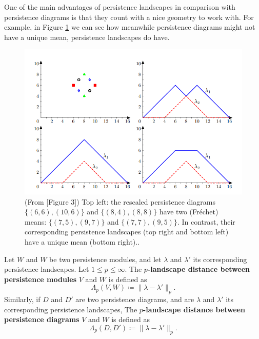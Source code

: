 \begin{example}
    One of the main advantages of persistence landscapes in comparison with persistence diagrams is that they count with a nice geometry to work with. For example, in Figure \ref{fig:landscape-means} we can see how meanwhile persistence diagrams might not have a unique mean, persistence landscapes do have.
    \begin{figure}[H]
        \centering
        \includegraphics[width=\linewidth]{figures/landscape-means.png}
        \caption[Means from persistence landscapes]{(From \cite{bubenik}[Figure 3]) Top left: the rescaled persistence diagrams $\{(6, 6), (10, 6)\}$ and $\{(8, 4), (8, 8)\}$ have two (Fréchet) means: $\{(7, 5), (9, 7)\}$ and $\{(7, 7), (9, 5)\}$. In contrast, their corresponding persistence landscapes (top right and bottom left) have a unique mean (bottom right)..}
        \label{fig:landscape-means}
    \end{figure}
\end{example}

\begin{definition}
    Let $ W $ and $ W $ be two persistence modules, and let $ \lambda $ and $ \lambda' $ its corresponding persistence landscapes. Let $ 1 \leq p \leq \infty $. The {\bf $p$-landscape distance between persistence modules} $ V $ and $ W $ is defined as
    \begin{equation}
        \Lambda_p(V, W) \coloneq \|\lambda - \lambda' \|_p.
    \end{equation}
    Similarly, if $ D $ and $ D' $ are two persistence diagrams, and are $ \lambda $ and $ \lambda' $ its corresponding persistence landscapes, The {\bf $p$-landscape distance between persistence diagrams} $ V $ and $ W $ is defined as
    \begin{equation}
        \Lambda_p(D, D') \coloneq \|\lambda - \lambda' \|_p.
    \end{equation}
\end{definition}

